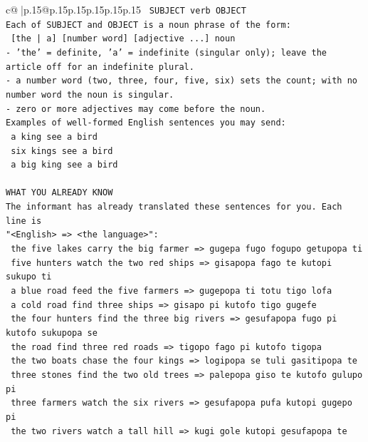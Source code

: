 \documentclass{article}
\begin{document}
{\begin{supertabular}{c@{$\;$}|p{.15\linewidth}@{}p{.15\linewidth}p{.15\linewidth}p{.15\linewidth}p{.15\linewidth}p{.15\linewidth}}
{{{\texttt{    SUBJECT  verb  OBJECT} \\
\texttt{Each of SUBJECT and OBJECT is a noun phrase of the form:} \\
\texttt{    {[}the | a{]}  {[}number word{]}  {[}adjective ...{]}  noun} \\
\texttt{{-} 'the' = definite, 'a' = indefinite (singular only); leave the article off for an indefinite plural.} \\
\texttt{{-} a number word (two, three, four, five, six) sets the count; with no number word the noun is singular.} \\
\texttt{{-} zero or more adjectives may come before the noun.} \\
\texttt{Examples of well{-}formed English sentences you may send:} \\
\texttt{    a king see a bird} \\
\texttt{    six kings see a bird} \\
\texttt{    a big king see a bird} \\
\\ 
\texttt{WHAT YOU ALREADY KNOW} \\
\texttt{The informant has already translated these sentences for you. Each line is} \\
\texttt{"<English>  =>  <the language>":} \\
\texttt{    the five lakes carry the big farmer  =>  gugepa fugo fogupo getupopa ti} \\
\texttt{    five hunters watch the two red ships  =>  gisapopa fago te kutopi sukupo ti} \\
\texttt{    a blue road feed the five farmers  =>  gugepopa ti totu tigo lofa} \\
\texttt{    a cold road find three ships  =>  gisapo pi kutofo tigo gugefe} \\
\texttt{    the four hunters find the three big rivers  =>  gesufapopa fugo pi kutofo sukupopa se} \\
\texttt{    the road find three red roads  =>  tigopo fago pi kutofo tigopa} \\
\texttt{    the two boats chase the four kings  =>  logipopa se tuli gasitipopa te} \\
\texttt{    three stones find the two old trees  =>  palepopa giso te kutofo gulupo pi} \\
\texttt{    three farmers watch the six rivers  =>  gesufapopa pufa kutopi gugepo pi} \\
\texttt{    the two rivers watch a tall hill  =>  kugi gole kutopi gesufapopa te} \\
}}}
\end{supertabular}}
\end{document}
